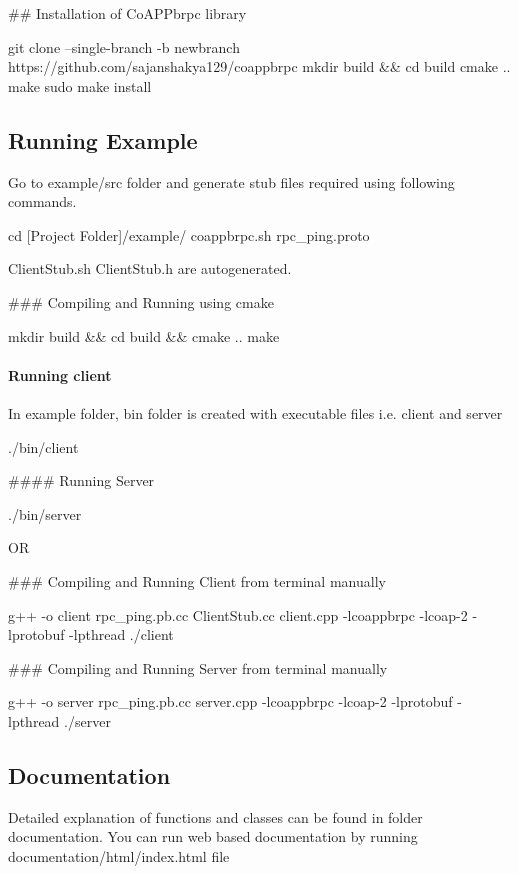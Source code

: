 \#\# Installation of Co\+A\+P\+Pbrpc library 
\begin{DoxyCode}
git clone --single-branch -b newbranch https://github.com/sajanshakya129/coappbrpc
mkdir build && cd build
cmake ..
make
sudo make install
\end{DoxyCode}


\subsection*{Running Example}

Go to example/src folder and generate stub files required using following commands. 
\begin{DoxyCode}
cd [Project Folder]/example/
coappbrpc.sh rpc\_ping.proto
\end{DoxyCode}
 Client\+Stub.\+sh Client\+Stub.\+h are autogenerated.

\#\#\# Compiling and Running using cmake 
\begin{DoxyCode}
mkdir build && cd build && cmake ..
make
\end{DoxyCode}
 \paragraph*{Running client}

In example folder, bin folder is created with executable files i.\+e. client and server 
\begin{DoxyCode}
./bin/client
\end{DoxyCode}
 \#\#\#\# Running Server 
\begin{DoxyCode}
./bin/server
\end{DoxyCode}
 OR

\#\#\# Compiling and Running Client from terminal manually 
\begin{DoxyCode}
g++ -o client rpc\_ping.pb.cc ClientStub.cc client.cpp -lcoappbrpc -lcoap-2 -lprotobuf -lpthread
./client
\end{DoxyCode}
 \#\#\# Compiling and Running Server from terminal manually 
\begin{DoxyCode}
g++ -o server rpc\_ping.pb.cc server.cpp -lcoappbrpc -lcoap-2 -lprotobuf -lpthread
./server
\end{DoxyCode}


\subsection*{Documentation}

Detailed explanation of functions and classes can be found in folder documentation. You can run web based documentation by running documentation/html/index.\+html file

